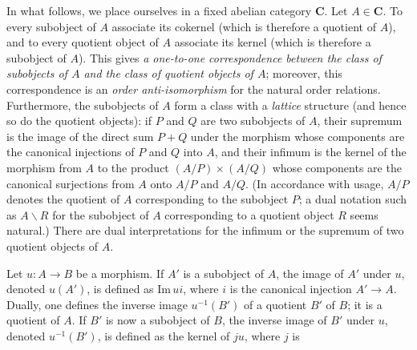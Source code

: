 In what follows, we place ourselves in a fixed abelian category $\mathbf{C}$. Let
$A\in\mathbf{C}$. To every subobject of $A$ associate its cokernel (which is therefore
a quotient of $A$), and to every quotient object of $A$ associate its kernel
(which is therefore a subobject of $A$). This gives \textit{a one-to-one
correspondence between the class of subobjects of $A$ and the class of quotient
objects of $A$}; moreover, this correspondence is an \textit{order
anti-isomorphism} for the natural order relations. Furthermore, the subobjects
of $A$ form a class with a \textit{lattice} structure (and hence so do the quotient objects): if $P$
and $Q$ are two subobjects of $A$, their supremum is the image of the direct
sum $P+Q$ under the morphism whose components are the canonical injections of
$P$ and $Q$ into $A$, and their infimum is the kernel of the morphism from $A$
to the product $(A/P)\times(A/Q)$ whose components are the canonical surjections from $A$ onto $A/P$
and $A/Q$. (In accordance with usage, $A/P$ denotes the quotient of $A$
corresponding to the subobject $P$; a dual notation such as $A\backslash R$ for
the subobject of $A$ corresponding to a quotient object $R$ seems natural.)
There are dual interpretations for the infimum or the supremum of two quotient
objects of $A$.

Let $u:A\to B$ be a morphism. If $A'$ is a subobject of $A$, the
image of $A'$ under $u$, denoted $u(A')$, is defined as $\mathrm{Im}\,ui$,
where $i$ is the canonical injection $A'\to A$. Dually, one
defines the inverse image $u^{-1}(B')$ of a quotient $B'$ of $B$; it is a
quotient of $A$. If $B'$ is now a subobject of $B$, the inverse image of $B'$
under $u$, denoted $u^{-1}(B')$, is defined as the kernel of $ju$, where $j$
is

